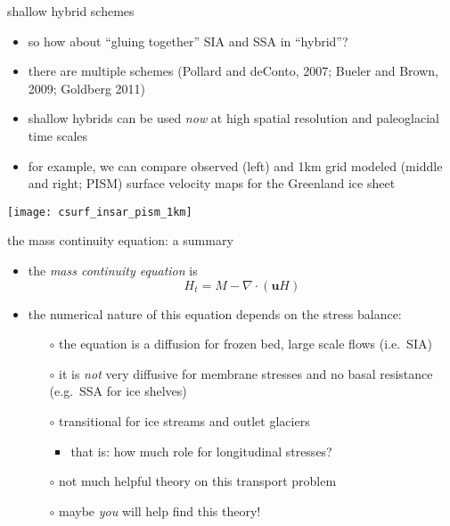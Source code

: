 \begin{frame}{shallow hybrid schemes}

\begin{itemize}
\small
\item so how about ``gluing together'' SIA and SSA in ``hybrid''?
\item there are multiple schemes \scriptsize(Pollard and deConto, 2007; Bueler and Brown, 2009; Goldberg 2011)
\small
\item shallow hybrids can be used \emph{now} at high spatial resolution and paleoglacial time scales
\item for example, we can compare observed (left) and 1km grid modeled (middle and right; PISM) surface velocity maps for the Greenland ice sheet
\end{itemize}

\vspace{-4mm}
\begin{center}
\texttt{[image: csurf\_insar\_pism\_1km]}
\end{center}
\end{frame}


\begin{frame}{the mass continuity equation: a summary}

\begin{itemize}
\item the \emph{mass continuity equation} is
  $$H_t = M - \nabla \cdot (\mathbf{u} H)$$
\item the numerical nature of this equation depends on the stress balance:
  \begin{itemize}
  \item[$\circ$] the equation is a diffusion for frozen bed, large scale flows (i.e.~SIA)
  \item[$\circ$] it is \emph{not} very diffusive for membrane stresses and no basal resistance (e.g.~SSA for ice shelves)
  \item[$\circ$] transitional for ice streams and outlet glaciers
    \begin{itemize}
    \item that is: how much role for longitudinal stresses?
    \end{itemize}
  \item[$\circ$] not much helpful theory on this transport problem
  \item[$\circ$] maybe \emph{you} will help find this theory!
  \end{itemize}
\end{itemize}
\end{frame}
